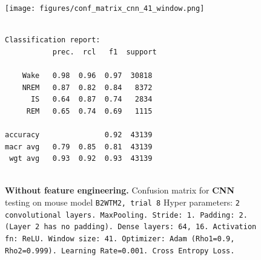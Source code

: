 \documentclass{article}
\begin{document}
\begin{figure}[H]
    \centering
    \begin{tcolorbox}[colframe=black, colback=white, sharp corners, boxrule=0.2mm, width=\textwidth]
        \begin{minipage}[t]{0.48\textwidth}
            \centering
            \texttt{[image: figures/conf\_matrix\_cnn\_41\_window.png]}
            \caption{\textbf{Without feature engineering.} Confusion matrix for \textbf{CNN} testing on mouse model \texttt{B2WTM2, trial 8} Hyper parameters: \texttt{2 convolutional layers. MaxPooling. Stride: 1. Padding: 2. (Layer 2 has no padding). Dense layers: 64, 16. Activation fn: ReLU. Window size: 41. Optimizer: Adam (Rho1=0.9, Rho2=0.999). Learning Rate=0.001. Cross Entropy Loss.}}
            \label{fig:cnn_fe_cm1}
            \vspace{0.5cm}
            {\small
        \begin{verbatim}

Classification report:
           prec.  rcl   f1  support

    Wake   0.98  0.96  0.97  30818
    NREM   0.87  0.82  0.84   8372
      IS   0.64  0.87  0.74   2834
     REM   0.65  0.74  0.69   1115

accuracy               0.92  43139
macr avg   0.79  0.85  0.81  43139
 wgt avg   0.93  0.92  0.93  43139


\end{verbatim}}
\end{minipage}
\end{tcolorbox}
\end{figure}
\end{document}
